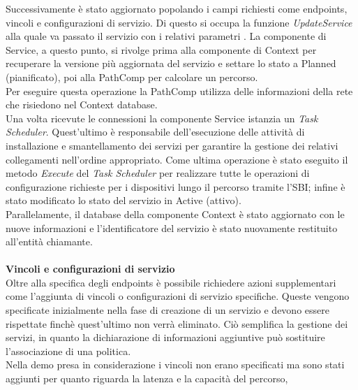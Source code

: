 Successivamente è stato aggiornato popolando i campi richiesti come endpoints, vincoli e configurazioni di servizio. 
Di questo si occupa la funzione \textit{UpdateService} alla quale va passato il servizio con i relativi parametri \cite{D32}.
La componente di Service, a questo punto, si rivolge prima alla componente di Context per recuperare la versione più aggiornata del servizio e settare lo stato a Planned (pianificato), poi alla PathComp per calcolare un percorso.
\\Per eseguire questa operazione la PathComp utilizza delle informazioni della rete che risiedono nel Context database.
\\Una volta ricevute le connessioni la componente Service istanzia un \textit{Task Scheduler}. %
Quest'ultimo è responsabile dell'esecuzione delle attività di installazione e smantellamento dei servizi per garantire la gestione dei relativi collegamenti nell'ordine appropriato.
Come ultima operazione è stato eseguito il metodo \textit{Execute} del \textit{Task Scheduler} per realizzare tutte le operazioni di configurazione richieste per i dispositivi lungo il percorso tramite l'SBI; infine è stato modificato lo stato del servizio in Active (attivo).
\\Parallelamente, il database della componente Context è stato aggiornato con le nuove informazioni e l'identificatore del servizio è stato nuovamente restituito all'entità chiamante.
\\
\\\textbf{Vincoli e configurazioni di servizio}
\\Oltre alla specifica degli endpoints è possibile richiedere azioni supplementari come l'aggiunta di vincoli o configurazioni di servizio specifiche. 
Queste vengono specificate inizialmente nella fase di creazione di un servizio e devono essere rispettate finchè quest'ultimo non verrà eliminato. 
Ciò semplifica la gestione dei servizi, in quanto la dichiarazione di informazioni aggiuntive può sostituire l'associazione di una politica.
\\Nella demo presa in considerazione i vincoli non erano specificati ma sono stati aggiunti per quanto riguarda la latenza e la capacità del percorso, 
